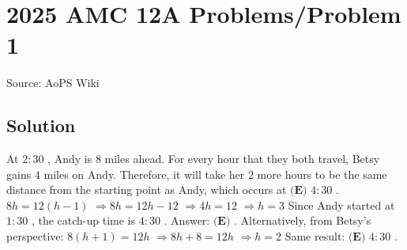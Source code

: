 \documentclass[12pt]{article}
\begin{document}
\section*{{2025 AMC 12A Problems/Problem 1}}
Source: AoPS Wiki

\subsection*{Solution}
At $2{:}30$ , Andy is $8$ miles ahead. For every hour that they both travel, Betsy gains $4$ miles on Andy. Therefore, it will take her $2$ more hours to be the same distance from the starting point as Andy, which occurs at $\boxed{\textbf{(E) } 4{:}30}$ . $8h = 12(h-1)$ $\Rightarrow 8h = 12h - 12$ $\Rightarrow 4h = 12$ $\Rightarrow h = 3$ Since Andy started at $1{:}30$ , the catch-up time is $4{:}30$ .
Answer: $\textbf{(E)}$ . Alternatively, from Betsy's perspective: $8(h+1) = 12h$ $\Rightarrow 8h + 8 = 12h$ $\Rightarrow h = 2$ Same result: $\textbf{(E) } 4{:}30$ .
\end{document}
